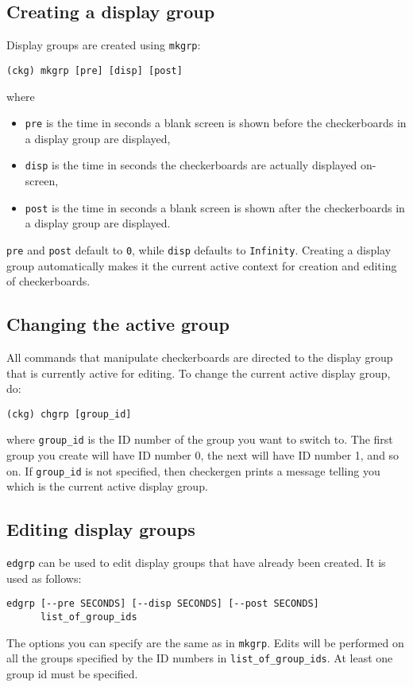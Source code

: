 \documentclass[12pt,titlepage]{article}
\newenvironment{compactemize}
{\begin{itemize}
  \setlength{\itemsep}{1.5pt}
  \setlength{\parskip}{0pt}
  \setlength{\parsep}{0pt}}
{\end{itemize}}
\begin{document}
\subsection{Creating a display group}
Display groups are created using \texttt{mkgrp}:
\begin{lstlisting}
(ckg) mkgrp [pre] [disp] [post]
\end{lstlisting}
where
\begin{compactemize}
\item \texttt{pre} is the time in seconds a blank screen is shown
  before the checkerboards in a display group are displayed,
\item \texttt{disp} is the time in seconds the checkerboards are
  actually displayed on-screen,
\item \texttt{post} is the time in seconds a blank screen is shown
  after the checkerboards in a display group are displayed.
\end{compactemize}
\texttt{pre} and \texttt{post} default to \texttt{0}, while
\texttt{disp} defaults to \texttt{Infinity}. Creating a display group
automatically makes it the current active context for creation and
editing of checkerboards.

\subsection{Changing the active group}
All commands that manipulate checkerboards are directed to the display
group that is currently active for editing. To change the current
active display group, do:
\begin{lstlisting}
(ckg) chgrp [group_id]
\end{lstlisting}
where \lstinline{group_id} is the ID number of the group you want to
switch to. The first group you create will have ID number 0, the next
will have ID number 1, and so on. If \lstinline{group_id} is not
specified, then checkergen prints a message telling you which is the
current active display group.

\subsection{Editing display groups}
\texttt{edgrp} can be used to edit display groups that have already
been created. It is used as follows:
\begin{lstlisting}
edgrp [--pre SECONDS] [--disp SECONDS] [--post SECONDS]
      list_of_group_ids
\end{lstlisting}
The options you can specify are the same as in \texttt{mkgrp}. Edits
will be performed on all the groups specified by the ID numbers in
\lstinline{list_of_group_ids}. At least one group id must be
specified.
\end{document}
